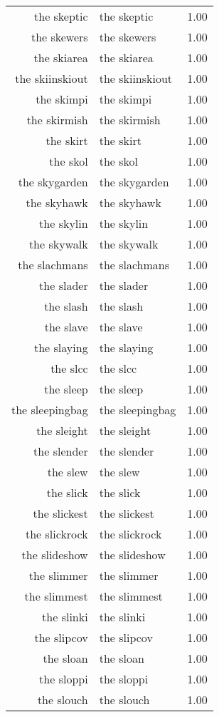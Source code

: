 \begin{table}[ht]
\begin{tabular}{rlr}
  the skeptic & the skeptic & 1.00 \\ 
  the skewers & the skewers & 1.00 \\ 
  the skiarea & the skiarea & 1.00 \\ 
  the skiinskiout & the skiinskiout & 1.00 \\ 
  the skimpi & the skimpi & 1.00 \\ 
  the skirmish & the skirmish & 1.00 \\ 
  the skirt & the skirt & 1.00 \\ 
  the skol & the skol & 1.00 \\ 
  the skygarden & the skygarden & 1.00 \\ 
  the skyhawk & the skyhawk & 1.00 \\ 
  the skylin & the skylin & 1.00 \\ 
  the skywalk & the skywalk & 1.00 \\ 
  the slachmans & the slachmans & 1.00 \\ 
  the slader & the slader & 1.00 \\ 
  the slash & the slash & 1.00 \\ 
  the slave & the slave & 1.00 \\ 
  the slaying & the slaying & 1.00 \\ 
  the slcc & the slcc & 1.00 \\ 
  the sleep & the sleep & 1.00 \\ 
  the sleepingbag & the sleepingbag & 1.00 \\ 
  the sleight & the sleight & 1.00 \\ 
  the slender & the slender & 1.00 \\ 
  the slew & the slew & 1.00 \\ 
  the slick & the slick & 1.00 \\ 
  the slickest & the slickest & 1.00 \\ 
  the slickrock & the slickrock & 1.00 \\ 
  the slideshow & the slideshow & 1.00 \\ 
  the slimmer & the slimmer & 1.00 \\ 
  the slimmest & the slimmest & 1.00 \\ 
  the slinki & the slinki & 1.00 \\ 
  the slipcov & the slipcov & 1.00 \\ 
  the sloan & the sloan & 1.00 \\ 
  the sloppi & the sloppi & 1.00 \\ 
  the slouch & the slouch & 1.00 \\ 

\end{tabular}
\end{table}
